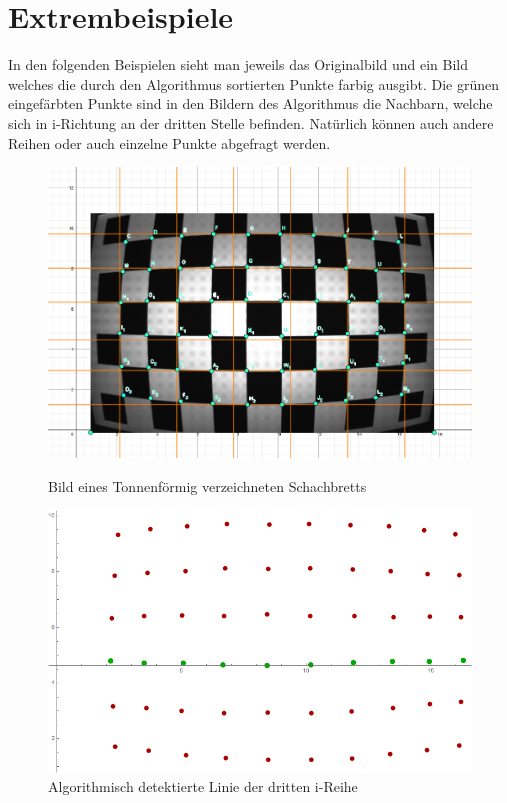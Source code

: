 \section{Extrembeispiele}
\label{sec:SchachAlgBeispiele}

In den folgenden Beispielen sieht man jeweils das Originalbild und ein Bild welches die durch den Algorithmus sortierten Punkte farbig ausgibt. Die grünen eingefärbten Punkte sind in den Bildern des Algorithmus die Nachbarn, welche sich in i-Richtung an der dritten Stelle befinden. Natürlich können auch andere Reihen oder auch einzelne Punkte abgefragt werden. 
\pagebreak

\begin{figure}[!htb]
	\includegraphics[width=\linewidth]{images/Tonnenverzeichnung.png}
	\caption{Bild eines Tonnenförmig verzeichneten Schachbretts}
	\label{fig:awesome_image1}
	\endminipage\hfill
	\includegraphics[width=\linewidth]{images/AlgTonnenverzeichnung.png}
	\caption{Algorithmisch detektierte Linie der dritten i-Reihe}
	\label{fig:awesome_image2}
	\endminipage\hfill
\end{figure}

